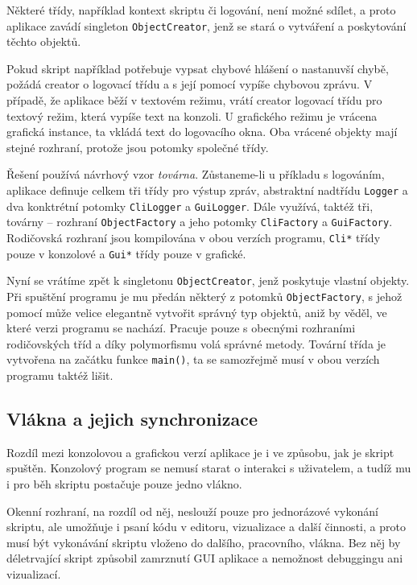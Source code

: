 \documentclass[11pt,twoside,a4paper]{book}
\begin{document}
Některé třídy, například kontext skriptu či logování, není možné sdílet, a proto aplikace zavádí singleton \texttt{ObjectCreator}, jenž se stará o vytváření a poskytování těchto objektů.

Pokud skript například potřebuje vypsat chybové hlášení o nastanuvší chybě, požádá creator o logovací třídu a s její pomocí vypíše chybovou zprávu. V případě, že aplikace běží v textovém režimu, vrátí creator logovací třídu pro textový režim, která vypíše text na konzoli. U grafického režimu je vrácena grafická instance, ta vkládá text do logovacího okna. Oba vrácené objekty mají stejné rozhraní, protože jsou potomky společné třídy.

Řešení používá návrhový vzor \textit{továrna}. Zůstaneme-li u příkladu s logováním, aplikace definuje celkem tři třídy pro výstup zpráv, abstraktní nadtřídu \texttt{Logger} a dva konktrétní potomky \texttt{CliLogger} a \texttt{GuiLogger}. Dále využívá, taktéž tři, továrny -- rozhraní \texttt{ObjectFactory} a jeho potomky \texttt{CliFactory} a \texttt{GuiFactory}. Rodičovská rozhraní jsou kompilována v obou verzích programu, \texttt{Cli*} třídy pouze v konzolové a \texttt{Gui*} třídy pouze v grafické.

Nyní se vrátíme zpět k singletonu \texttt{ObjectCreator}, jenž poskytuje vlastní objekty. Při spuštění programu je mu předán některý z potomků \texttt{ObjectFactory}, s jehož pomocí může velice elegantně vytvořit správný typ objektů, aniž by věděl, ve které verzi programu se nachází. Pracuje pouze s obecnými rozhraními rodičovských tříd a díky polymorfismu volá správné metody. Tovární třída je vytvořena na začátku funkce \texttt{main()}, ta se samozřejmě musí v obou verzích programu taktéž lišit.


\subsection{Vlákna a jejich synchronizace}

Rozdíl mezi konzolovou a grafickou verzí aplikace je i ve způsobu, jak je skript spuštěn. Konzolový program se nemusí starat o interakci s uživatelem, a tudíž mu i pro běh skriptu postačuje pouze jedno vlákno.

Okenní rozhraní, na rozdíl od něj, neslouží pouze pro jednorázové vykonání skriptu, ale umožňuje i psaní kódu v editoru, vizualizace a další činnosti, a proto musí být vykonávání skriptu vloženo do dalšího, pracovního, vlákna. Bez něj by déletrvající skript způsobil zamrznutí GUI aplikace a nemožnost debuggingu ani vizualizací.
\end{document}

